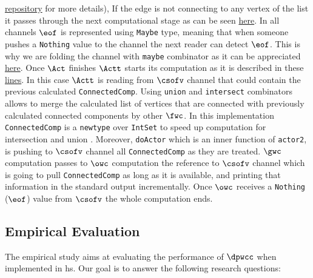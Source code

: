 \href{https://github.com/jproyo/upc-miri-tfm/blob/17ee929f64a8be8a88ced782bfcf6bf355d8580a/connected-comp/src/ConnComp/Internal.hs#L50-L73}{repository} for more details), If the edge is not connecting to any vertex of the list it passes through the next computational stage as can be seen \href{https://github.com/jproyo/upc-miri-tfm/blob/17ee929f64a8be8a88ced782bfcf6bf355d8580a/connected-comp/src/ConnComp/Internal.hs#L55-L59}{here}. In all channels $\eof$ is represented using \texttt{Maybe} type, meaning that when someone pushes a \texttt{Nothing} value to the channel the next reader can detect $\eof$. This is why we are folding the channel with \texttt{maybe} combinator as it can be appreciated \href{https://github.com/jproyo/upc-miri-tfm/blob/17ee929f64a8be8a88ced782bfcf6bf355d8580a/connected-comp/src/ConnComp/Internal.hs#L51}{here}. Once $\Act$ finishes $\Actt$ starts its computation as it is described in these \href{https://github.com/jproyo/upc-miri-tfm/blob/17ee929f64a8be8a88ced782bfcf6bf355d8580a/connected-comp/src/ConnComp/Internal.hs#L62-L73}{lines}. In this case $\Actt$ is reading from $\csofv$ channel that could contain the previous calculated \texttt{ConnectedComp}. Using \texttt{union} and \texttt{intersect} combinators allows to merge the calculated list of vertices that are connected with previously calculated connected components by other $\fwc$. In this implementation \texttt{ConnectedComp} is a \texttt{newtype} over \texttt{IntSet} to speed up computation for intersection and union \cite{containers}. Moreover,  \texttt{doActor} which is an inner function of \texttt{actor2}, is pushing to $\csofv$ channel all \texttt{ConnectedComp} as they are treated. $\gwc$ computation passes to $\owc$ computation the reference to $\csofv$ channel which is going to pull \texttt{ConnectedComp} as long as it is available, and printing that information in the standard output incrementally. Once $\owc$ receives a \texttt{Nothing} ($\eof$) value from $\csofv$ the whole computation ends.

%

\subsection{Empirical Evaluation}\label{sec:evaluation}
The empirical study aims at evaluating the performance of $\dpwcc$ when implemented in \acrshort{hs}. 
Our goal is to answer the following research questions: 

